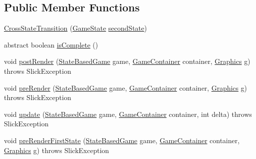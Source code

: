 \subsection*{Public Member Functions}
\begin{DoxyCompactItemize}
\item 
\mbox{\hyperlink{classorg_1_1newdawn_1_1slick_1_1state_1_1transition_1_1_cross_state_transition_a0062eac1fd64938d473ca4d6ffaaa6ee}{Cross\+State\+Transition}} (\mbox{\hyperlink{interfaceorg_1_1newdawn_1_1slick_1_1state_1_1_game_state}{Game\+State}} \mbox{\hyperlink{classorg_1_1newdawn_1_1slick_1_1state_1_1transition_1_1_cross_state_transition_a75dc8f5366c67cb40b833672578fd7e5}{second\+State}})
\item 
abstract boolean \mbox{\hyperlink{classorg_1_1newdawn_1_1slick_1_1state_1_1transition_1_1_cross_state_transition_a2a81c43dc051ee2290787a5a10ab2ac2}{is\+Complete}} ()
\item 
void \mbox{\hyperlink{classorg_1_1newdawn_1_1slick_1_1state_1_1transition_1_1_cross_state_transition_ad932e1984f648e582290937e9f1c880f}{post\+Render}} (\mbox{\hyperlink{classorg_1_1newdawn_1_1slick_1_1state_1_1_state_based_game}{State\+Based\+Game}} game, \mbox{\hyperlink{classorg_1_1newdawn_1_1slick_1_1_game_container}{Game\+Container}} container, \mbox{\hyperlink{classorg_1_1newdawn_1_1slick_1_1_graphics}{Graphics}} g)  throws Slick\+Exception 
\item 
void \mbox{\hyperlink{classorg_1_1newdawn_1_1slick_1_1state_1_1transition_1_1_cross_state_transition_abcc8e000421b21be33f4165808023f54}{pre\+Render}} (\mbox{\hyperlink{classorg_1_1newdawn_1_1slick_1_1state_1_1_state_based_game}{State\+Based\+Game}} game, \mbox{\hyperlink{classorg_1_1newdawn_1_1slick_1_1_game_container}{Game\+Container}} container, \mbox{\hyperlink{classorg_1_1newdawn_1_1slick_1_1_graphics}{Graphics}} g)  throws Slick\+Exception 
\item 
void \mbox{\hyperlink{classorg_1_1newdawn_1_1slick_1_1state_1_1transition_1_1_cross_state_transition_ab619f7506eb8e6c1ff13c86e79a99777}{update}} (\mbox{\hyperlink{classorg_1_1newdawn_1_1slick_1_1state_1_1_state_based_game}{State\+Based\+Game}} game, \mbox{\hyperlink{classorg_1_1newdawn_1_1slick_1_1_game_container}{Game\+Container}} container, int delta)  throws Slick\+Exception 
\item 
void \mbox{\hyperlink{classorg_1_1newdawn_1_1slick_1_1state_1_1transition_1_1_cross_state_transition_a2b0f6825775c51f909cdabda0feb8d73}{pre\+Render\+First\+State}} (\mbox{\hyperlink{classorg_1_1newdawn_1_1slick_1_1state_1_1_state_based_game}{State\+Based\+Game}} game, \mbox{\hyperlink{classorg_1_1newdawn_1_1slick_1_1_game_container}{Game\+Container}} container, \mbox{\hyperlink{classorg_1_1newdawn_1_1slick_1_1_graphics}{Graphics}} g)  throws Slick\+Exception 

\end{DoxyCompactItemize}
